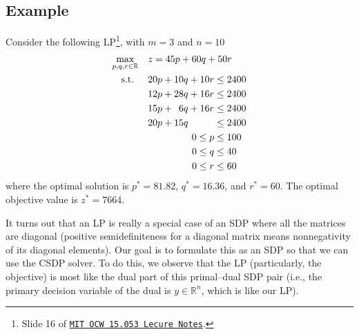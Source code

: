 \documentclass[a4paper]{article}
\begin{document}
\subsection*{Example}
Consider the following LP\footnote{Slide 16 of \href{https://ocw.mit.edu/courses/sloan-school-of-management/15-053-optimization-methods-in-management-science-spring-2013/tutorials/MIT15_053S13_tut01.pdf}{\texttt{MIT OCW 15.053 Lecure Notes}}.}, with $m=3$ and $n=10$
\begin{equation}\label{eq:example-lp}
\begin{split}
\max_{p,q,r\in\mathbb{R}}  \quad & z = 45p + 60q + 50r \\
\textrm{s.t. } \quad &
  \begin{aligned}[t]
    20p + 10q + 10r &\le 2400 \\
    12p + 28q + 16r &\le 2400 \\
    15p + \hphantom{0}6q  + 16r &\le 2400 \\
    20p + 15q \hphantom{{}+{}00r} &\le 2400 \\
    0 \le p &\le 100 \\
    0 \le q &\le 40 \\
    0 \le r &\le 60
  \end{aligned}
\end{split}
\end{equation}
where the optimal solution is $p^*=81.82$, $q^*=16.36$, and $r^*=60$.
The optimal objective value is $z^*=7664$.

It turns out that an LP is really a special case of an SDP where all the matrices are diagonal (positive semidefiniteness for a diagonal matrix means nonnegativity of its diagonal elements).
Our goal is to formulate this as an SDP so that we can use the CSDP solver.
To do this, we observe that the LP (particularly, the objective) is most like the dual part of this primal--dual SDP pair (i.e., the primary decision variable of the dual is $y\in\mathbb{R}^n$, which is like our LP).
\end{document}
